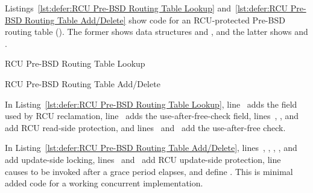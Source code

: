 Listings~\ref{lst:defer:RCU Pre-BSD Routing Table Lookup}
and~\ref{lst:defer:RCU Pre-BSD Routing Table Add/Delete}
show code for an RCU-protected Pre-BSD routing table
().
The former shows data structures and ,
and the latter shows  and .

\begin{listing}[tbp]

\caption{RCU Pre-BSD Routing Table Lookup}
\label{lst:defer:RCU Pre-BSD Routing Table Lookup}
\end{listing}

\begin{listing}[tbp]

\caption{RCU Pre-BSD Routing Table Add/Delete}
\label{lst:defer:RCU Pre-BSD Routing Table Add/Delete}
\end{listing}

\begin{fcvref}
In Listing~\ref{lst:defer:RCU Pre-BSD Routing Table Lookup},
line~ adds the  field used by RCU reclamation,
line~ adds the  use-after-free-check field,
lines~, , and~
add RCU read-side protection,
and lines~ and~ add the use-after-free check.
\end{fcvref}
\begin{fcvref}
In Listing~\ref{lst:defer:RCU Pre-BSD Routing Table Add/Delete},
lines~, , ,
, and~ add update-side locking,
lines~ and~ add RCU update-side protection,
line~ causes  to be invoked after
a grace period elapses,
and  define .
This is minimal added code for a working concurrent implementation.
\end{fcvref}

